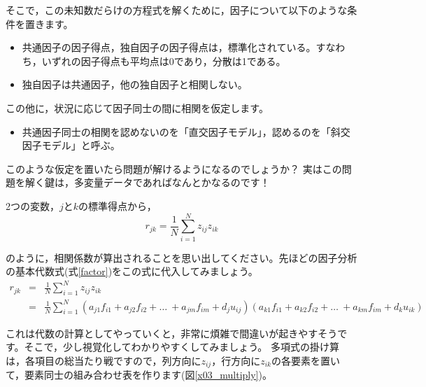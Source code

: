 \documentclass{ltjsbook}
\begin{document}
そこで，この未知数だらけの方程式を解くために，因子について以下のような条件を置きます。
\begin{itemize}
    \item 共通因子の因子得点，独自因子の因子得点は，標準化されている。すなわち，いずれの因子得点も平均点は0であり，分散は1である。
    \item 独自因子は共通因子，他の独自因子と相関しない。
\end{itemize}
この他に，状況に応じて因子同士の間に相関を仮定します。
\begin{itemize}
    \item 共通因子同士の相関を認めないのを「直交因子モデル」，認めるのを「斜交因子モデル」と呼ぶ。
\end{itemize}

このような仮定を置いたら問題が解けるようになるのでしょうか？ 実はこの問題を解く鍵は，多変量データであればなんとかなるのです！

2つの変数，$j$と$k$の標準得点から，
\begin{equation}
    r_{jk}=\frac{1}{N} \sum_{i=1}^{N} z_{ij}z_{ik}
\end{equation}

のように，相関係数が算出されることを思い出してください。先ほどの因子分析の基本代数式(式\ref{factor})をこの式に代入してみましょう。
\begin{equation}
    \begin{array}{ccl}
        r_{jk} & = & \displaystyle{\frac{1}{N} \sum_{i=1}^{N} z_{ij}z_{ik}}                                                                                                                  \\
               & = & \displaystyle{\frac{1}{N} \sum_{i=1}^{N}}(a_{j1}f_{i1}+a_{j2}f_{i2}+ \ldots \ +a_{jm}f_{im}+d_{j}u_{ij})(a_{k1}f_{i1}+a_{k2}f_{i2}+ \ldots \ +a_{km}f_{im}+d_{k}u_{ik})
    \end{array}
\end{equation}

これは代数の計算としてやっていくと，非常に煩雑で間違いが起きやすそうです。そこで，少し視覚化してわかりやすくしてみましょう。
多項式の掛け算は，各項目の総当たり戦ですので，列方向に$z_{ij}$，行方向に$z_{ik}$の各要素を置いて，要素同士の組み合わせ表を作ります(図\ref{x03_multiply})。
\end{document}
